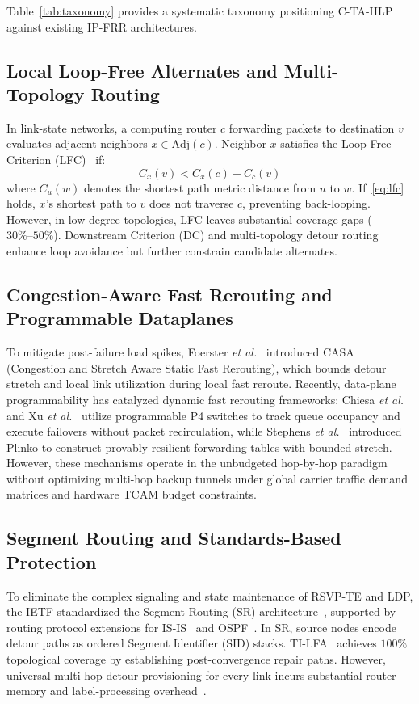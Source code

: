 \documentclass[journal]{IEEEtran}
\begin{document}
Table~\ref{tab:taxonomy} provides a systematic taxonomy positioning C-TA-HLP against existing IP-FRR architectures.

\subsection{Local Loop-Free Alternates and Multi-Topology Routing}
In link-state networks, a computing router $c$ forwarding packets to destination $v$ evaluates adjacent neighbors $x \in \text{Adj}(c)$. Neighbor $x$ satisfies the Loop-Free Criterion (LFC)~\cite{rfc5286} if:
\begin{equation}
C_x(v) < C_x(c) + C_c(v)
\label{eq:lfc}
\end{equation}
where $C_u(w)$ denotes the shortest path metric distance from $u$ to $w$. If~\eqref{eq:lfc} holds, $x$'s shortest path to $v$ does not traverse $c$, preventing back-looping. However, in low-degree topologies, LFC leaves substantial coverage gaps ($30\%\text{--}50\%$). Downstream Criterion (DC) and multi-topology detour routing~\cite{merindol2011efficient} enhance loop avoidance but further constrain candidate alternates.

\subsection{Congestion-Aware Fast Rerouting and Programmable Dataplanes}
To mitigate post-failure load spikes, Foerster \textit{et al.}~\cite{foerster2019casa} introduced CASA (Congestion and Stretch Aware Static Fast Rerouting), which bounds detour stretch and local link utilization during local fast reroute. Recently, data-plane programmability has catalyzed dynamic fast rerouting frameworks: Chiesa \textit{et al.}~\cite{chiesa2021fast} and Xu \textit{et al.}~\cite{xu2021p4neighbor} utilize programmable P4 switches to track queue occupancy and execute failovers without packet recirculation, while Stephens \textit{et al.}~\cite{stephens2013plinko} introduced Plinko to construct provably resilient forwarding tables with bounded stretch. However, these mechanisms operate in the unbudgeted hop-by-hop paradigm without optimizing multi-hop backup tunnels under global carrier traffic demand matrices and hardware TCAM budget constraints.

\subsection{Segment Routing and Standards-Based Protection}
To eliminate the complex signaling and state maintenance of RSVP-TE and LDP, the IETF standardized the Segment Routing (SR) architecture~\cite{rfc8402}, supported by routing protocol extensions for IS-IS~\cite{rfc8667} and OSPF~\cite{rfc8665}. In SR, source nodes encode detour paths as ordered Segment Identifier (SID) stacks. TI-LFA~\cite{rfc9855} achieves $100\%$ topological coverage by establishing post-convergence repair paths. However, universal multi-hop detour provisioning for every link incurs substantial router memory and label-processing overhead~\cite{bramas2025simple,ventre2021segment,luttringer2020computing}.
\end{document}
